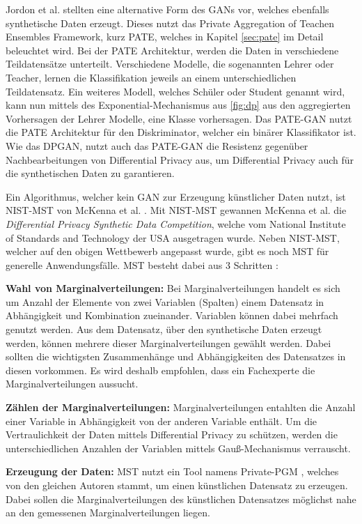 Jordon et al. \cite{P-68} stellten eine alternative Form des GANs vor, welches ebenfalls synthetische Daten erzeugt. 
Dieses nutzt das Private Aggregation of Teachen Ensembles Framework, kurz PATE, welches in Kapitel \ref{sec:pate} im Detail beleuchtet wird.
Bei der PATE Architektur, werden die Daten in verschiedene Teildatensätze unterteilt. 
Verschiedene Modelle, die sogenannten Lehrer oder Teacher, lernen die Klassifikation jeweils an einem unterschiedlichen Teildatensatz.
Ein weiteres Modell, welches Schüler oder Student genannt wird, kann nun mittels des Exponential-Mechanismus aus \ref{fig:dp} aus den aggregierten Vorhersagen der Lehrer Modelle, eine Klasse vorhersagen.
Das PATE-GAN nutzt die PATE Architektur für den Diskriminator, welcher ein binärer Klassifikator ist.
Wie das DPGAN, nutzt auch das PATE-GAN die Resistenz gegenüber Nachbearbeitungen von Differential Privacy aus, um Differential Privacy auch für die synthetischen Daten zu garantieren.


Ein Algorithmus, welcher kein GAN zur Erzeugung künstlicher Daten nutzt, ist NIST-MST von McKenna et al. \cite{P-95}.
Mit NIST-MST gewannen McKenna et al. die \textit{Differential Privacy Synthetic Data Competition}, welche vom National Institute of Standards and Technology der USA ausgetragen wurde.
Neben NIST-MST, welcher auf den obigen Wettbewerb angepasst wurde, gibt es noch MST für generelle Anwendungsfälle.
MST besteht dabei aus 3 Schritten \cite{P-95}:
\begin{compactenum}
    \item \textbf{Wahl von Marginalverteilungen:} Bei Marginalverteilungen handelt es sich um Anzahl der Elemente von zwei Variablen (Spalten) einem Datensatz in Abhängigkeit und Kombination zueinander. Variablen können dabei mehrfach genutzt werden. Aus dem Datensatz, über den synthetische Daten erzeugt werden, können mehrere dieser Marginalverteilungen gewählt werden. Dabei sollten die wichtigsten Zusammenhänge und Abhängigkeiten des Datensatzes in diesen vorkommen. Es wird deshalb empfohlen, dass ein Fachexperte die Marginalverteilungen aussucht.
    \item \textbf{Zählen der Marginalverteilungen:} Marginalverteilungen entahlten die Anzahl einer Variable in Abhängigkeit von der anderen Variable enthält. Um die Vertraulichkeit der Daten mittels Differential Privacy zu schützen, werden die unterschiedlichen Anzahlen der Variablen mittels Gauß-Mechanismus verrauscht.
    \item \textbf{Erzeugung der Daten:} MST nutzt ein Tool namens Private-PGM \cite{P-97}, welches von den gleichen Autoren stammt, um einen künstlichen Datensatz zu erzeugen. Dabei sollen die Marginalverteilungen des künstlichen Datensatzes möglichst nahe an den gemessenen Marginalverteilungen liegen.
\end{compactenum}